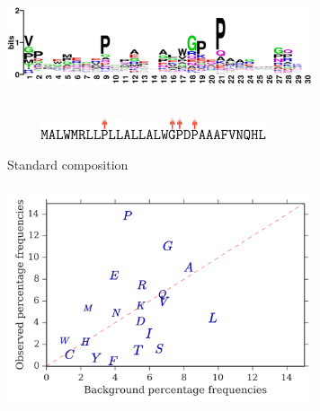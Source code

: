 \documentclass{beamer}
\begin{document}
\begin{frame}
\begin{adjustwidth}{-1.5em}{-2.5em}
\includegraphics[width=340px,height=150px]{../img/logo.png}\\ 
\hspace{18px}\includegraphics[width=325px,height=25px]{../img/sequence2.png}
\end{adjustwidth}
\end{frame}










\begin{frame}
\centering
Standard composition
\begin{adjustwidth}{-1.5em}{-2.5em}
\includegraphics[width=340px,height=250px]{../img/frequenciesComparison.png}\\ 
\end{adjustwidth}
\end{frame}
\end{document}
